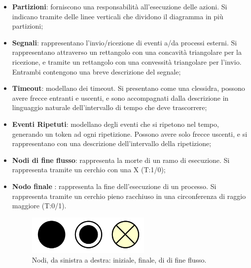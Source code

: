\begin{itemize}
	\item \textbf{Partizioni}: forniscono una responsabilità all'esecuzione delle azioni. Si indicano tramite delle linee verticali che dividono il diagramma in più partizioni;
	\item \textbf{Segnali}: rappresentano l'invio/ricezione di eventi a/da processi esterni. Si rappresentano attraverso un rettangolo con una concavità triangolare per la ricezione, e tramite un rettangolo con una convessità triangolare per l'invio. Entrambi contengono una breve descrizione del segnale;
	\item \textbf{Timeout}: modellano dei timeout. Si presentano come una clessidra, possono avere frecce entranti e uscenti, e sono accompagnati dalla descrizione in linguaggio naturale dell'intervallo di tempo che deve trascorrere;
	\item \textbf{Eventi Ripetuti}: modellano degli eventi che si ripetono nel tempo, generando un token ad ogni ripetizione. Possono avere solo frecce uscenti, e si rappresentano con una descrizione dell'intervallo della ripetizione;
	\item \textbf{Nodi di fine flusso}: rappresenta la morte di un ramo di esecuzione. Si rappresenta tramite un cerchio con una X (T:1/0);
	\item \textbf{Nodo finale} : rappresenta la fine dell'esecuzione di un processo. Si rappresenta tramite un cerchio pieno racchiuso in una circonferenza di raggio maggiore (T:0/1).
	\begin{figure}[H]
		\centering
		\includegraphics[width=6cm,keepaspectratio]{img/nodi.png}
		\caption{Nodi, da sinistra a destra: iniziale, finale, di di fine flusso.}
	\end{figure}
\end{itemize}

